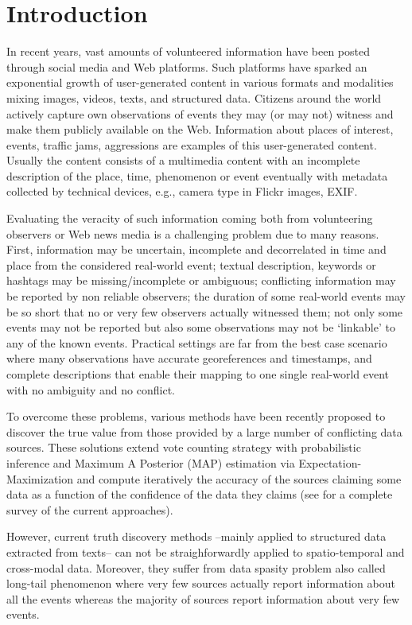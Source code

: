 \section{Introduction}

In recent years, vast amounts of volunteered information have been posted through social media  and Web platforms. Such platforms have sparked an exponential growth of user-generated content in various formats and modalities mixing images, videos, texts, and structured data.  Citizens around the world actively capture own observations of events they may (or may not) witness and make them publicly available on the Web. 
Information about places of interest, events, traffic jams, aggressions are examples of this user-generated content. 
Usually the content consists of a multimedia content with an incomplete description of the place, time, phenomenon or event  eventually with metadata collected by technical devices, e.g., camera type in Flickr images, EXIF.


Evaluating the veracity of such information coming both from volunteering observers or  Web news media is a challenging problem due to many reasons. First, information may be uncertain, incomplete and decorrelated in time and place from the considered real-world event; textual description, keywords or hashtags may be missing/incomplete or ambiguous; conflicting information may be reported by non reliable observers; the duration of some real-world events may be so short that no or very few observers actually witnessed them; not only some events may not be reported but also some observations may not be `linkable' to any of the known events.  Practical settings are far from the best case scenario where many observations have accurate georeferences and timestamps, and  complete descriptions that enable their mapping to one single real-world event with no ambiguity and no conflict.  

To overcome these problems, various methods have been recently proposed to discover
the true value from those provided by a large number of conflicting data sources.  These solutions extend
vote counting strategy with probabilistic inference and Maximum A Posterior (MAP) estimation via Expectation-Maximization and compute iteratively
the accuracy of the sources claiming some data as a function of the confidence of the data they claims (see \cite{Berti2015} for a complete survey of the current
approaches).

However, current truth discovery methods --mainly applied to structured data extracted from texts-- can not be straighforwardly applied to spatio-temporal and cross-modal data. 
Moreover, they  suffer from data spasity problem also called long-tail phenomenon where very few sources actually report information about all the events whereas the majority of sources report information about very few events.


